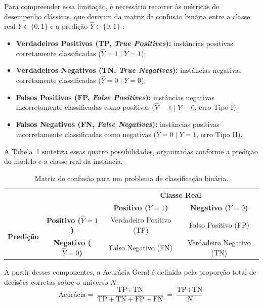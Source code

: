 Para compreender essa limitação, é necessário recorrer às métricas de desempenho clássicas, que derivam da matriz de confusão binária entre a classe real $Y \in \{0, 1\}$ e a predição $\hat{Y} \in \{0, 1\}$ \cite{sokolova2009systematic}:
\begin{itemize}
    \item \textbf{Verdadeiros Positivos (TP, \emph{True Positives}):} instâncias positivas corretamente classificadas ($\hat{Y} = 1 \mid Y = 1$);
    \item \textbf{Verdadeiros Negativos (TN, \emph{True Negatives}):} instâncias negativas corretamente classificadas ($\hat{Y} = 0 \mid Y = 0$);
    \item \textbf{Falsos Positivos (FP, \emph{False Positives}):} instâncias negativas incorretamente classificadas como positivas ($\hat{Y} = 1 \mid Y = 0$, erro Tipo I);
    \item \textbf{Falsos Negativos (FN, \emph{False Negatives}):} instâncias positivas incorretamente classificadas como negativas ($\hat{Y} = 0 \mid Y = 1$, erro Tipo II).
\end{itemize}

A Tabela~\ref{tab:confusion_matrix} sintetiza essas quatro possibilidades, organizadas conforme a predição do modelo e a classe real da instância.

\begin{table}[h]
    \centering
    \caption{Matriz de confusão para um problema de classificação binária.}
    \label{tab:confusion_matrix}
    \begin{tabular}{cc|cc}
        & & \multicolumn{2}{c}{\textbf{Classe Real}} \\
        & & \textbf{Positivo ($Y=1$)} & \textbf{Negativo ($Y=0$)} \\
        \hline
        \multirow{2}{*}{\textbf{Predição}} & \textbf{Positivo ($\hat{Y}=1$)} & Verdadeiro Positivo (TP) & Falso Positivo (FP) \\
        & \textbf{Negativo ($\hat{Y}=0$)} & Falso Negativo (FN) & Verdadeiro Negativo (TN) \\
    \end{tabular}
\end{table}

A partir desses componentes, a Acurácia Geral é definida pela proporção total de decisões corretas sobre o universo $N$:
\begin{equation}
\text{Acurácia} = \frac{\text{TP} + \text{TN}}{\text{TP} + \text{TN} + \text{FP} + \text{FN}} = \frac{\text{TP} + \text{TN}}{N}
\end{equation}



